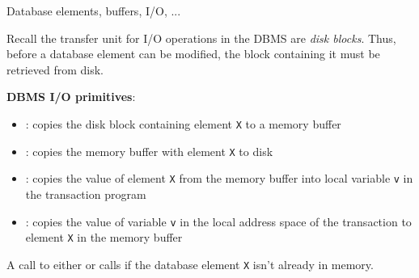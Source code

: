%
%
\begin{frame}{Database elements, buffers, I/O, ...}

Recall the transfer unit for I/O operations in the DBMS are \emph{disk blocks}. Thus, before a database element can be modified, the block containing it must be retrieved from disk.

\textbf{DBMS I/O primitives}:

\begin{itemize}[-,noitemsep]
\item {}: copies the disk block containing element \texttt{X} to a memory buffer
\item {}: copies the memory buffer with element \texttt{X} to disk
\item {}: copies the value of element \texttt{X} from the memory buffer into local variable \texttt{v} in the transaction program
\item {}: copies the value of variable \texttt{v} in the local address space of the transaction to element \texttt{X} in the memory buffer
\end{itemize}

A call to either  or  calls  if the database element \texttt{X} isn't already in memory.

\end{frame}


\newsavebox\compilerAddedCodeForConsistency
{}


